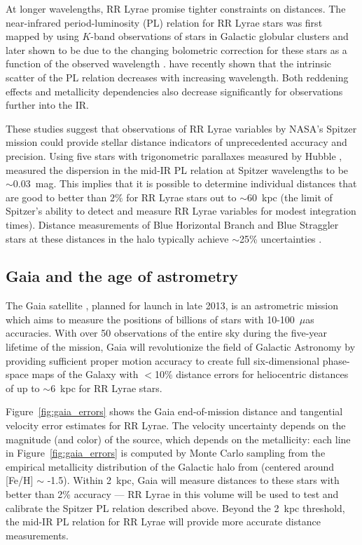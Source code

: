 \documentclass{emulateapj}
\begin{document}
At longer wavelengths, RR Lyrae promise tighter constraints on
distances.  The near-infrared period-luminosity (PL) relation for RR
Lyrae stars was first mapped by \citet{longmore86} using $K$-band
observations of stars in Galactic globular clusters and later shown to
be due to the changing bolometric correction for these stars as a
function of the observed wavelength \citep{catelan04}.
\citet{madore12} have recently shown that the intrinsic scatter of the
PL relation decreases with increasing wavelength. Both reddening
effects and metallicity dependencies also decrease significantly for
observations further into the IR.

These studies suggest that observations of RR Lyrae variables by
NASA's Spitzer mission could provide stellar distance indicators of
unprecedented accuracy and precision.  Using five stars with
trigonometric parallaxes measured by Hubble \citep{benedict11},
\citet{madore12} measured the dispersion in the mid-IR PL relation at
Spitzer wavelengths to be $\sim$0.03~mag. This implies that it is
possible to determine individual distances that are good to better
than $2\%$ for RR Lyrae stars out to $\sim$60~kpc (the limit of
Spitzer's ability to detect and measure RR Lyrae variables for modest
integration times). Distance measurements of Blue Horizontal Branch
and Blue Straggler stars at these distances in the halo typically
achieve $\sim$25\% uncertainties \citep[e.g.,][]{deason12b}.


\subsection{Gaia and the age of astrometry}
\label{sec:gaia}
The Gaia satellite \citep{gaia01}, planned for launch in late 2013, is
an astrometric mission which aims to measure the positions of billions
of stars with 10-100~$\mu$as accuracies. With over 50 observations of
the entire sky during the five-year lifetime of the mission, Gaia will
revolutionize the field of Galactic Astronomy by providing sufficient
proper motion accuracy to create full six-dimensional phase-space maps
of the Galaxy with $<$10\% distance errors for heliocentric distances of
up to $\sim$6~kpc for RR Lyrae stars.

Figure~\ref{fig:gaia_errors} shows the Gaia end-of-mission distance
and tangential velocity error estimates for RR Lyrae. The velocity
uncertainty depends on the magnitude (and color) of the source, which depends on
the metallicity: each line in Figure~\ref{fig:gaia_errors} is computed
by Monte Carlo sampling from the empirical metallicity distribution of
the Galactic halo from \cite{ivezic08} (centered around [Fe/H] $\sim$
-1.5). Within 2~kpc, Gaia will measure distances to these stars with
better than 2\% accuracy --- RR Lyrae in this volume will be used to
test and calibrate the Spitzer PL relation described above. Beyond the
2~kpc threshold, the mid-IR PL relation for RR Lyrae will provide more
accurate distance measurements.
\end{document}

